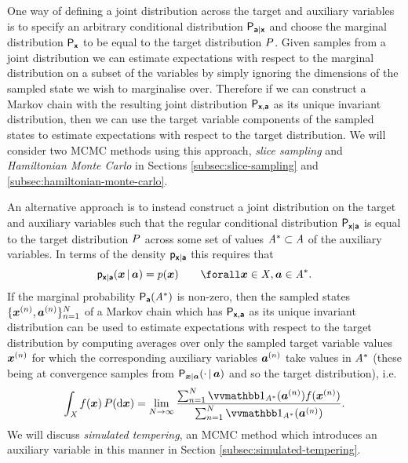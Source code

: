 One way of defining a joint distribution across the target and auxiliary variables is to specify an arbitrary conditional distribution $\mathsf{P}_{\boldsymbol{\mathsf{a}}|\boldsymbol{\mathsf{x}}}$ and choose the marginal distribution $\mathsf{P}_{\boldsymbol{\mathsf{x}}}$ to be equal to the target distribution $P$. Given samples from a joint distribution we can estimate expectations with respect to the marginal distribution on a subset of the variables by simply ignoring the dimensions of the sampled state we wish to marginalise over. Therefore if we can construct a Markov chain with the resulting joint distribution $\mathsf{P}_{\boldsymbol{\mathsf{x}},\boldsymbol{\mathsf{a}}}$ as its unique invariant distribution, then we can use the target variable components of the sampled states to estimate expectations with respect to the target distribution. We will consider two \ac{MCMC} methods using this approach, \emph{slice sampling} and \emph{Hamiltonian Monte Carlo} in Sections \ref{subsec:slice-sampling} and \ref{subsec:hamiltonian-monte-carlo}.

An alternative approach is to instead construct a joint distribution on the target and auxiliary variables such that the regular conditional distribution $\mathsf{P}_{\boldsymbol{\mathsf{x}}|\boldsymbol{\mathsf{a}}}$ is equal to the target distribution $P$ across some set of values $\mathit{A}^* \subset \mathit{A}$ of the auxiliary variables. In terms of the density $\mathsf{p}_{\boldsymbol{\mathsf{x}}|\boldsymbol{\mathsf{a}}}$ this requires that
\begin{equation}\label{eq:conditional-auxiliary-variable-property}
  \pden{\rvct{x}|\rvct{a}}(\vct{x}\gvn\vct{a}) = \tgtdens(\vct{x}) \qquad \forall \vct{x} \in \set{X}, \vct{a} \in \set{A}^*.
\end{equation}
If the marginal probability $\mathsf{P}_{\boldsymbol{\mathsf{a}}}(\mathit{A}^*)$ is non-zero, then the sampled states $\lbrace \boldsymbol{x}^{(n)},\boldsymbol{a}^{(n)}\rbrace_{n=1}^N$ of a Markov chain which has $\mathsf{P}_{\boldsymbol{\mathsf{x}},\boldsymbol{\mathsf{a}}}$ as its unique invariant distribution can be used to estimate expectations with respect to the target distribution by computing averages over only the sampled target variable values $\boldsymbol{x}^{(n)}$ for which the corresponding auxiliary variables $\boldsymbol{a}^{(n)}$ take values in $\mathit{A}^*$ (these being at convergence samples from $\mathsf{P}_{\boldsymbol{x}|\boldsymbol{a}}(\cdot \operatorname{|} \boldsymbol{a})$ and so the target distribution), i.e.
\begin{equation}\label{eq:conditional-auxiliary-variable-estimator}
  \int_{\set{X}} f(\vct{x}) \,\tgtprob(\dr\vct{x}) =
  \lim_{N\to \infty} 
  \frac
    {\sum_{n=1}^N \ind{\set{A}^*}(\vct{a}^{(n)}) f(\vct{x}^{(n)})}
    {\sum_{n=1}^N \ind{\set{A}^*}(\vct{a}^{(n)})}.
\end{equation}
We will discuss \emph{simulated tempering}, an \ac{MCMC} method which introduces an auxiliary variable in this manner in Section \ref{subsec:simulated-tempering}.

